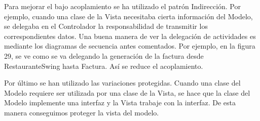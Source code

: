 \documentclass[spanish,a4paper,11pt, twoside]{report}	%
\begin{document}
Para mejorar el bajo acoplamiento se ha utilizado el patrón Indirección. Por ejemplo, cuando una clase de la Vista necesitaba cierta información del Modelo, se delegaba en el Controlador la responsabilidad de transmitir los correspondientes datos. Una buena manera de ver la delegación de actividades es mediante los diagramas de secuencia antes comentados. Por ejemplo, en la figura 29, se ve como se va delegando la generación de la factura desde RestauranteSwing hasta Factura. Así se reduce el acoplamiento. 

Por último se han utilizado las variaciones protegidas. Cuando una clase del Modelo requiere ser utilizada por una clase de la Vista, se hace que la clase del Modelo implemente una interfaz y la Vista trabaje con la interfaz. De esta manera conseguimos proteger la vista del modelo.


\newpage
\mbox{}
\thispagestyle{empty}						%
\newpage
\end{document}
